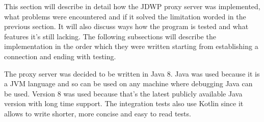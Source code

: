 \documentclass[..thesis.tex]{subfiles}
\begin{document}
This section will describe in detail how the JDWP proxy server was implemented, what problems were encountered and if it solved the limitation worded in the previous section.
It will also discuss ways how the program is tested and what features it's still lacking.
The following subsections will describe the implementation in the order which they were written starting from establishing a connection and ending with testing.

The proxy server was decided to be written in Java 8.
Java was used because it is a JVM language and so can be used on any machine where debugging Java can be used.
Version 8 was used because that's the latest publicly available Java version with long time support.
The integration tests also use Kotlin since it allows to write shorter, more concise and easy to read tests.
\end{document}
